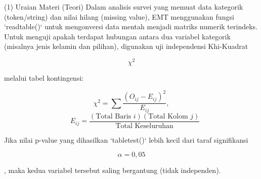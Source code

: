 \documentclass{article}
\newenvironment{eulernotebook}{\par}{\par}
\newenvironment{eulercomment}{\par\medskip}{\par\medskip}
\newenvironment{eulerformula}{}{}
\begin{document}
\begin{eulernotebook}
\begin{eulercomment}
\begin{eulercomment}
\begin{eulercomment}
\begin{eulercomment}
\begin{eulercomment}
\begin{eulercomment}
\begin{eulercomment}
(1) Uraian Materi (Teori) Dalam analisis survei yang memuat data
kategorik (token/string) dan nilai hilang (missing value), EMT
menggunakan fungsi `readtable()` untuk mengonversi data mentah menjadi
matriks numerik terindeks. Untuk menguji apakah terdapat hubungan
antara dua variabel kategorik (misalnya jenis kelamin dan pilihan),
digunakan uji independensi Khi-Kuadrat\\
\end{eulercomment}
\begin{eulerformula}
\[
\chi^2
\]
\end{eulerformula}
\begin{eulercomment}
melalui tabel kontingensi:\\
\end{eulercomment}
\begin{eulerformula}
\[
\chi^2 = \sum \frac{(O_{ij} - E_{ij})^2}{E_{ij}},
\]
\end{eulerformula}
\begin{eulerformula}
\[
\quad E_{ij} = \frac{(\text{Total Baris } i)(\text{Total Kolom } j)}{\text{Total Keseluruhan}}
\]
\end{eulerformula}
\begin{eulercomment}
Jika nilai p-value yang dihasilkan `tabletest()` lebih kecil dari
taraf signifikansi\\
\end{eulercomment}
\begin{eulerformula}
\[
\alpha = 0,05
\]
\end{eulerformula}
\begin{eulercomment}
, maka kedua variabel tersebut saling bergantung (tidak independen).


\end{eulercomment}
\end{eulercomment}
\end{eulercomment}
\end{eulercomment}
\end{eulercomment}
\end{eulercomment}
\end{eulercomment}
\end{eulernotebook}
\end{document}
